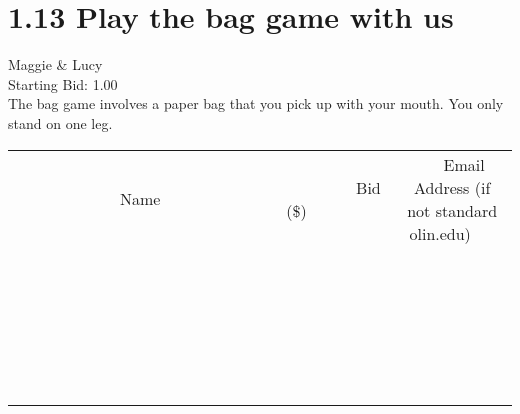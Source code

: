 \documentclass[11pt]{article}
\begin{document}
					\section*{1.13 Play the bag game with us}
					Maggie \& Lucy \\
					Starting Bid: 1.00 \\
					The bag game involves a paper bag that you pick up with your mouth. You only stand on one leg. \\
					[6ex]
					\begin{tabular}{c c c}
						~~~~~~~~~~~~~Name~~~~~~~~~~~~~ & ~~~~~~~~~Bid (\$)~~~~~~~~~ & ~~~Email Address (if not standard olin.edu)~~~ \\
				
 & & \\
\hline
 & & \\
\hline
 & & \\
\hline
 & & \\
\hline
 & & \\
\hline
 & & \\
\hline
 & & \\
\hline
 & & \\
\hline
 & & \\
\hline
 & & \\
\hline
 & & \\
\hline
 & & \\
\hline
 & & \\
\hline
 & & \\
\hline
 & & \\
\hline
 & & \\
\hline
 & & \\
\hline
 & & \\
\hline
 & & \\
\hline
 & & \\
\hline
 & & \\
\hline
 & & \\
\hline
 & & \\
\hline
 & & \\
\hline
 & & \\
\hline
 & & \\
\hline
					\end{tabular}
					\clearpage
				
\end{document}
